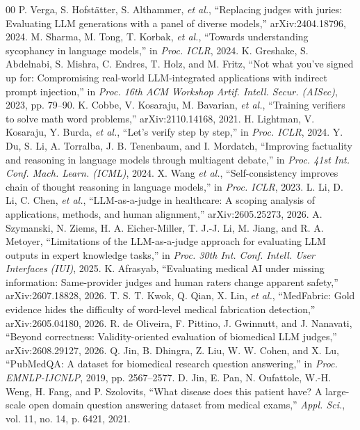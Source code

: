 \documentclass[conference]{IEEEtran}
\begin{document}
\begin{thebibliography}{00}
 P. Verga, S. Hofst\"{a}tter, S. Althammer, \textit{et al.}, ``Replacing judges with juries: Evaluating LLM generations with a panel of diverse models,'' arXiv:2404.18796, 2024.
 M. Sharma, M. Tong, T. Korbak, \textit{et al.}, ``Towards understanding sycophancy in language models,'' in \textit{Proc. ICLR}, 2024.
 K. Greshake, S. Abdelnabi, S. Mishra, C. Endres, T. Holz, and M. Fritz, ``Not what you've signed up for: Compromising real-world LLM-integrated applications with indirect prompt injection,'' in \textit{Proc. 16th ACM Workshop Artif. Intell. Secur. (AISec)}, 2023, pp. 79--90.
 K. Cobbe, V. Kosaraju, M. Bavarian, \textit{et al.}, ``Training verifiers to solve math word problems,'' arXiv:2110.14168, 2021.
 H. Lightman, V. Kosaraju, Y. Burda, \textit{et al.}, ``Let's verify step by step,'' in \textit{Proc. ICLR}, 2024.
 Y. Du, S. Li, A. Torralba, J. B. Tenenbaum, and I. Mordatch, ``Improving factuality and reasoning in language models through multiagent debate,'' in \textit{Proc. 41st Int. Conf. Mach. Learn. (ICML)}, 2024.
 X. Wang \textit{et al.}, ``Self-consistency improves chain of thought reasoning in language models,'' in \textit{Proc. ICLR}, 2023.
 L. Li, D. Li, C. Chen, \textit{et al.}, ``LLM-as-a-judge in healthcare: A scoping analysis of applications, methods, and human alignment,'' arXiv:2605.25273, 2026.
 A. Szymanski, N. Ziems, H. A. Eicher-Miller, T. J.-J. Li, M. Jiang, and R. A. Metoyer, ``Limitations of the LLM-as-a-judge approach for evaluating LLM outputs in expert knowledge tasks,'' in \textit{Proc. 30th Int. Conf. Intell. User Interfaces (IUI)}, 2025.
 K. Afrasyab, ``Evaluating medical AI under missing information: Same-provider judges and human raters change apparent safety,'' arXiv:2607.18828, 2026.
 T. S. T. Kwok, Q. Qian, X. Lin, \textit{et al.}, ``MedFabric: Gold evidence hides the difficulty of word-level medical fabrication detection,'' arXiv:2605.04180, 2026.
 R. de Oliveira, F. Pittino, J. Gwinnutt, and J. Nanavati, ``Beyond correctness: Validity-oriented evaluation of biomedical LLM judges,'' arXiv:2608.29127, 2026.
 Q. Jin, B. Dhingra, Z. Liu, W. W. Cohen, and X. Lu, ``PubMedQA: A dataset for biomedical research question answering,'' in \textit{Proc. EMNLP-IJCNLP}, 2019, pp. 2567--2577.
 D. Jin, E. Pan, N. Oufattole, W.-H. Weng, H. Fang, and P. Szolovits, ``What disease does this patient have? A large-scale open domain question answering dataset from medical exams,'' \textit{Appl. Sci.}, vol. 11, no. 14, p. 6421, 2021.

\end{thebibliography}
\end{document}
